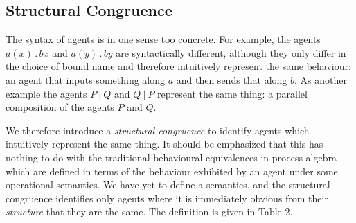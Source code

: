 \documentclass[10pt,a4paper]{article}
\newcommand{\outp}[2]{\overline{#1}#2}
\newcommand{\inpp}[2]{#1(#2)}
\newcommand{\prefix}[2]{{#1}\,.\,#2}
\newcommand{\inp}[3]{\prefix{\inpp{#1}{#2}}{#3}}
\newcommand{\para}{\:|\:}
\begin{document}
\subsection{Structural Congruence}

The syntax of agents is in one sense too concrete. For example, the agents $\inp{a}{x}{\outp{b}{x}}$ and $\inp{a}{y}{\outp{b}{y}}$ are syntactically different, although they only differ in the choice of bound name and therefore intuitively represent the same behaviour: an agent that inputs something along $a$ and then sends that along $\overline{b}$. As another example the agents $P \para Q$ and $Q \para P$ represent the same thing: a parallel composition of the agents $P$ and $Q$. 

We therefore introduce a \emph{structural congruence} to identify agents which intuitively represent the same thing. It should be emphasized that this has nothing to do with the traditional behavioural equivalences in process algebra which are defined in terms of the behaviour exhibited by an agent under some operational semantics. We have yet to define a semantics, and the structural congruence identifies only agents where it is immediately obvious from their \emph{structure} that they are the same. The definition is given in Table 2.
\end{document}
